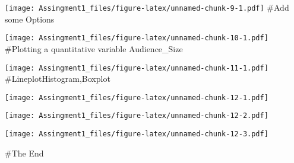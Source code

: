 \documentclass[]{article}
\newenvironment{Shaded}{\begin{snugshade}}{\end{snugshade}}
\newcommand{\AttributeTok}[1]{\textcolor[rgb]{0.77,0.63,0.00}{#1}}
\newcommand{\FunctionTok}[1]{\textcolor[rgb]{0.00,0.00,0.00}{#1}}
\newcommand{\NormalTok}[1]{#1}
\newcommand{\SpecialCharTok}[1]{\textcolor[rgb]{0.00,0.00,0.00}{#1}}
\newcommand{\StringTok}[1]{\textcolor[rgb]{0.31,0.60,0.02}{#1}}
\begin{document}
\texttt{[image: Assingment1\_files/figure-latex/unnamed-chunk-9-1.pdf]}
\#Add some Options

\begin{Shaded}
\end{Shaded}

\texttt{[image: Assingment1\_files/figure-latex/unnamed-chunk-10-1.pdf]}
\#Plotting a quantitative variable Audience\_Size

\begin{Shaded}
\end{Shaded}

\texttt{[image: Assingment1\_files/figure-latex/unnamed-chunk-11-1.pdf]}
\#LineplotHistogram,Boxplot

\begin{Shaded}
\end{Shaded}

\texttt{[image: Assingment1\_files/figure-latex/unnamed-chunk-12-1.pdf]}

\begin{Shaded}
\end{Shaded}

\texttt{[image: Assingment1\_files/figure-latex/unnamed-chunk-12-2.pdf]}

\begin{Shaded}
\end{Shaded}

\texttt{[image: Assingment1\_files/figure-latex/unnamed-chunk-12-3.pdf]}

\#The End
\end{document}
